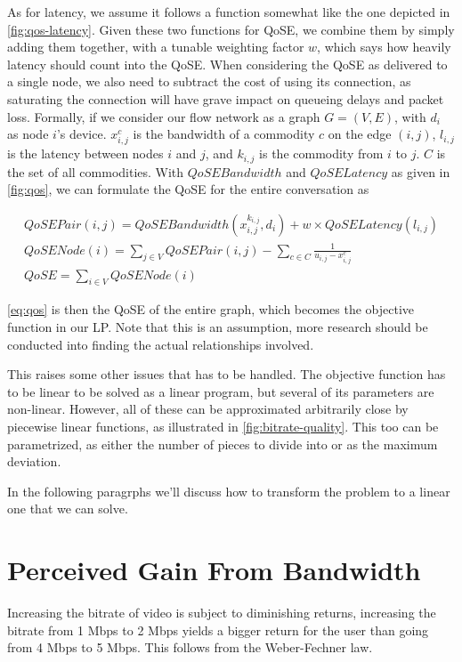 As for latency, we assume it follows a function somewhat like the one depicted in \autoref{fig:qos-latency}. Given these two functions for QoSE, we combine them by simply adding them together, with a tunable weighting factor $w$, which says how heavily latency should count into the QoSE. When considering the QoSE as delivered to a single node, we also need to subtract the cost of using its connection, as saturating the connection will have grave impact on queueing delays and packet loss. Formally, if we consider our flow network as a graph $G = (V, E)$, with $d_i$ as node $i$'s device. $x^c_{i,j}$ is the bandwidth of a commodity $c$ on the edge $(i,j)$, $l_{i,j}$ is the latency between nodes $i$ and $j$, and $k_{i,j}$ is the commodity from $i$ to $j$. $C$ is the set of all commodities. With $QoSEBandwidth$ and $QoSELatency$ as given in \autoref{fig:qos}, we can formulate the QoSE for the entire conversation as

\begin{gather}\label{eq:qos-pair}
    QoSEPair(i, j) = QoSEBandwidth(x_{i, j}^{k_{i, j}}, d_i) + w \times QoSELatency(l_{i,j}) \\
    QoSENode(i) = \sum_{j \in V} QoSEPair(i, j) - \sum_{c \in C} \frac{1}{u_{i,j} - x_{i,j}^{c}} \\
    QoSE = \sum_{i \in V} QoSENode(i) \label{eq:qos}
\end{gather}

\autoref{eq:qos} is then the QoSE of the entire graph, which becomes the objective function in our LP. Note that this is an assumption, more research should be conducted into finding the actual relationships involved.

This raises some other issues that has to be handled. The objective function has to be linear to be solved as a linear program, but several of its parameters are non-linear. However, all of these can be approximated arbitrarily close by piecewise linear functions, as illustrated in \autoref{fig:bitrate-quality}. This too can be parametrized, as either the number of pieces to divide into or as the maximum deviation.

In the following paragrphs we'll discuss how to transform the problem to a linear one that we can solve.


\section{Perceived Gain From Bandwidth}

Increasing the bitrate of video is subject to diminishing returns, increasing the bitrate from 1 Mbps to 2 Mbps yields a bigger return for the user than going from 4 Mbps to 5 Mbps. This follows from the Weber-Fechner law.

